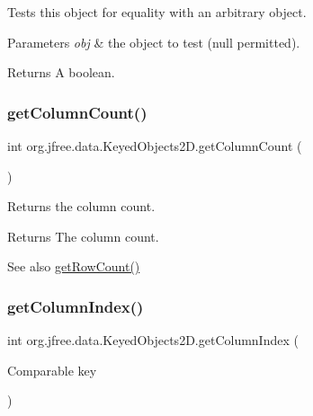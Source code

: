 Tests this object for equality with an arbitrary object.


\begin{DoxyParams}{Parameters}
{\em obj} & the object to test ({\ttfamily null} permitted).\\
\hline
\end{DoxyParams}
\begin{DoxyReturn}{Returns}
A boolean. 
\end{DoxyReturn}
\mbox{\label{classorg_1_1jfree_1_1data_1_1_keyed_objects2_d_a5278f36b18983c828dabc81392d30552}} 
\subsubsection{\texorpdfstring{get\+Column\+Count()}{getColumnCount()}}
{\footnotesize\ttfamily int org.\+jfree.\+data.\+Keyed\+Objects2\+D.\+get\+Column\+Count (\begin{DoxyParamCaption}{ }\end{DoxyParamCaption})}

Returns the column count.

\begin{DoxyReturn}{Returns}
The column count.
\end{DoxyReturn}
\begin{DoxySeeAlso}{See also}
\mbox{\hyperlink{classorg_1_1jfree_1_1data_1_1_keyed_objects2_d_acc38620c65b59e8ea4caa08e99901f53}{get\+Row\+Count()}} 
\end{DoxySeeAlso}
\mbox{\label{classorg_1_1jfree_1_1data_1_1_keyed_objects2_d_a40168035f23e5d7cc542e079ff71573d}} 
\subsubsection{\texorpdfstring{get\+Column\+Index()}{getColumnIndex()}}
{\footnotesize\ttfamily int org.\+jfree.\+data.\+Keyed\+Objects2\+D.\+get\+Column\+Index (\begin{DoxyParamCaption}\item[{Comparable}]{key }\end{DoxyParamCaption})}

